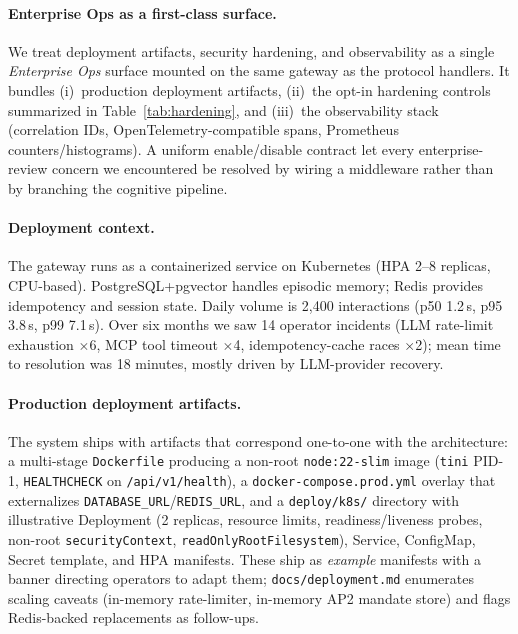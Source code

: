 \documentclass[11pt]{article}
\begin{document}
\paragraph{Enterprise Ops as a first-class surface.} We treat deployment artifacts, security hardening, and observability as a single \emph{Enterprise Ops} surface mounted on the same gateway as the protocol handlers. It bundles (i)~production deployment artifacts, (ii)~the opt-in hardening controls summarized in Table~\ref{tab:hardening}, and (iii)~the observability stack (correlation IDs, OpenTelemetry-compatible spans, Prometheus counters/histograms). A uniform enable/disable contract let every enterprise-review concern we encountered be resolved by wiring a middleware rather than by branching the cognitive pipeline.

\paragraph{Deployment context.} The gateway runs as a containerized service on Kubernetes (HPA 2--8 replicas, CPU-based). PostgreSQL+pgvector handles episodic memory; Redis provides idempotency and session state. Daily volume is 2,400 interactions (p50 1.2\,s, p95 3.8\,s, p99 7.1\,s). Over six months we saw 14 operator incidents (LLM rate-limit exhaustion $\times$6, MCP tool timeout $\times$4, idempotency-cache races $\times$2); mean time to resolution was 18 minutes, mostly driven by LLM-provider recovery.

\paragraph{Production deployment artifacts.} The system ships with artifacts that correspond one-to-one with the architecture: a multi-stage \texttt{Dockerfile} producing a non-root \texttt{node:22-slim} image (\texttt{tini} PID-1, \texttt{HEALTHCHECK} on \texttt{/api/v1/health}), a \texttt{docker-compose.prod.yml} overlay that externalizes \texttt{DATABASE\_URL}/\texttt{REDIS\_URL}, and a \texttt{deploy/k8s/} directory with illustrative Deployment (2 replicas, resource limits, readiness/liveness probes, non-root \texttt{securityContext}, \texttt{readOnlyRootFilesystem}), Service, ConfigMap, Secret template, and HPA manifests. These ship as \emph{example} manifests with a banner directing operators to adapt them; \texttt{docs/deployment.md} enumerates scaling caveats (in-memory rate-limiter, in-memory AP2 mandate store) and flags Redis-backed replacements as follow-ups.
\end{document}
